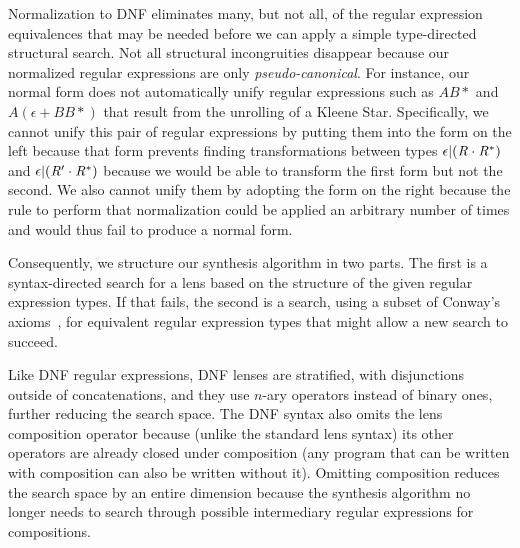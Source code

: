 \documentclass[numbers,10pt,preprint\ifanon ,nocopyrightspace\fi]{sigplanconf}
\begin{document}
Normalization to DNF eliminates many, but not all, of the regular
expression equivalences that may be needed before we can apply a
simple type-directed structural search.  Not all structural
incongruities disappear because our normalized regular expressions are
only \emph{pseudo-canonical}.  For instance, our normal form does not
automatically unify regular expressions such as $A B*$ and $A
(\epsilon + BB*)$ that result from the unrolling of a Kleene Star.
Specifically, we cannot unify this pair of regular expressions by
putting them into the form on the left because that form prevents
finding transformations between types $\epsilon |
(\mathit{R} \cdot {\ensuremath{\mathit{R}}}^*)$ and $\epsilon |
(\mathit{R}' \cdot {\ensuremath{\mathit{R}}}^*)$ because we would be able to
transform the first form but not the second.  We also cannot unify
them by adopting the form on the right because the rule to perform
that normalization could be applied an arbitrary number of times and
would thus fail to produce a normal form.


Consequently, we structure our synthesis algorithm in two parts.  The
first is a syntax-directed search for a lens based on the structure of the given
regular expression types. If that fails, the second is a search,
using a subset of Conway's axioms~\cite{conway}, for 
equivalent regular expression types that might allow a new search to succeed.

Like DNF regular expressions, DNF lenses are stratified, with disjunctions
outside of concatenations, and they use $n$-ary operators instead of binary
ones, further reducing the search space.  The DNF syntax also omits the lens
composition operator because (unlike the standard lens syntax) its other
operators are already closed under composition (any program that can be
written with composition can also be written without it).  Omitting composition
reduces the
search space by an entire dimension because the synthesis algorithm no
longer needs to search through possible intermediary regular expressions for
compositions.
\end{document}
